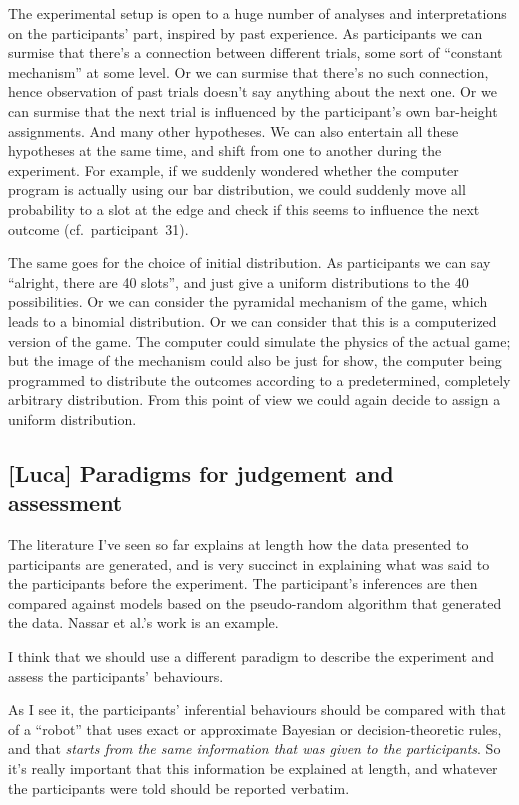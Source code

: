 \documentclass[\ifafour a4paper,12pt,\else a5paper,10pt,\fi%
onecolumn,oneside,article,%
british%
]{memoir}
\newcommand*{\etal}{{et al.}}
\theoremstyle{remark}
\theoremstyle{innote}
\newcommand*{\citey}{\parencites*}
\renewcommand*{\|}{\mathpunct{|}}
\newcommand*{\cf}{{cf.}}
\begin{document}
The experimental setup is open to a huge number of analyses and
interpretations on the participants' part, inspired by past experience. As
participants we can surmise that there's a connection between different
trials, some sort of \enquote{constant mechanism} at some level. Or we can
surmise that there's no such connection, hence observation of past trials
doesn't say anything about the next one. Or we can surmise that the next
trial is influenced by the participant's own bar-height assignments. And
many other hypotheses. We can also entertain all these hypotheses at the
same time, and shift from one to another during the experiment. For
example, if we suddenly wondered whether the computer program is actually
using our bar distribution, we could suddenly move all probability to a
slot at the edge and check if this seems to influence the next outcome
(\cf\ participant~31).

The same goes for the choice of initial distribution. As
participants we can say \enquote{alright, there are 40 slots}, and just
give a uniform distributions to the 40 possibilities. Or we can consider
the pyramidal mechanism of the game, which leads to a binomial
distribution. Or we can consider that this is a computerized version of the
game. The computer could simulate the physics of the actual game; but the
image of the mechanism could also be just for show, the computer being
programmed to distribute the outcomes according to a predetermined,
completely arbitrary distribution. From this point of view we could again
decide to assign a uniform distribution.

\subsection{[Luca] Paradigms for judgement and assessment}

The literature I've seen so far explains at length how the data presented
to participants are generated, and is very succinct in explaining what was
said to the participants before the experiment. The participant's
inferences are then compared against models based on the pseudo-random
algorithm that generated the data. Nassar \etal's \citey{nassaretal2010}
work is an example.

I think that we should use a different paradigm to describe the experiment
and assess the participants' behaviours.

As I see it, the participants' inferential behaviours should be compared
with that of a \enquote{robot} that uses exact or approximate Bayesian or
decision-theoretic rules, and that \emph{starts from the same information
  that was given to the participants}. So it's really important that this
information be explained at length, and whatever the participants were told
should be reported verbatim.
\end{document}
